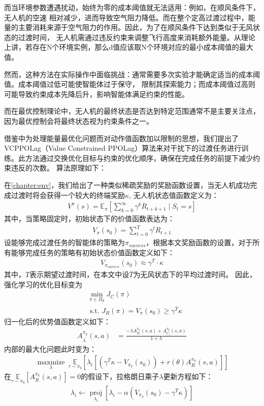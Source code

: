 而当环境参数遭遇扰动，始终为零的成本阈值就无法适用：例如，在顺风条件下，无人机的空速
相对减少，进而导致空气阻力降低。而在整个定高过渡过程中，能量的主要消耗来源于空气阻力的作用。因此，为了在顺风条件下达到类似于无风状态的过渡时间，
无人机需通过违反约束来调整飞行高度来消耗额外能量。从理论上讲，若存在N个环境实例，那么d值应该取N个环境对应的最小成本阈值的最大值。

然而，这种方法在实际操作中面临挑战：通常需要多次实验才能确定适当的成本阈值。成本阈值过低可能使智能体过于保守，
限制其探索能力；而成本阈值过高则可能导致约束成本先降后升，影响智能体满足约束的性能。

而在最优控制理论中，无人机的最终状态是否达到特定范围通常不是主要关注点，因为最优控制会将最终状态视为约束条件之一。

借鉴\parencite{bohez2019value}中为处理能量最优化问题而对动作值函数加以限制的思想，我们提出了
VCPPOLag（Value Constrained PPOLag）算法来对干扰下的过渡任务进行训练。此方法通过交换优化目标与约束的优化顺序，确保在完成任务的前提下减少约束违反的次数。
算法原理如下：

在\autoref{chapter:env}，我们给出了一种类似稀疏奖励的奖励函数设置，当无人机成功完成过渡时将会获得一个较大的终端奖励$\kappa$,
无人机状态值函数定义为：
\begin{align}
    V^{\pi}\left(s\right) = \mathbb{E}_{\pi }\left[\sum_{k = 0}^{\infty} \gamma^{k} R_{t+k+1}\mid S_{t}= s\right]
\end{align}
其中，当策略固定时，初始状态下的价值函数表达为：
\begin{align}
    V_{\pi}\left(s_{0}\right) = \sum_{t = 0}^{T} \gamma^{t} R_{t+1}
\end{align}
设能够完成过渡任务的智能体的策略为$\pi_{success}$，根据本文奖励函数的设置，对于所有能够完成任务的策略有初始状态价值函数定义如下：
\begin{align}
    V_{\pi_{success}}\left(s_{0}\right) \approx   \gamma^{T} \cdot \kappa
\end{align}
其中，$T$表示期望过渡时间，在本文中设$\bar{T}$为无风状态下的平均过渡时间。
因此，强化学习的优化目标变为
\begin{align}
    &\min _{\pi \in \Pi_{\theta}} J_{C}(\pi) \\
    &\text { s.t. } J_{R}(\pi)=V_{\pi}(s_{0}) \ge \gamma^{\bar{T}}\kappa
\end{align}
归一化后的优势值函数定义如下：
\begin{align} 
    {A}_{\lambda^{\prime}}^{\pi_{k}}(s, a)&=\frac{-\lambda A_{R}^{\pi_{k}}(s, a) +  A_{C_{i}}^{\pi_{k}}(s, a)}{1+ \lambda} 
\end{align}
内部的最大化问题此时变为：
\begin{align}
    \underset{\lambda}{\operatorname{maxmize}} \ \underset{\tau \sim \pi_{k}}{\mathbb{E}}\left[\lambda_{i}\left[(\gamma^{\bar{T}}\kappa-V_{\pi_{k}}(s_{0}))+r(\theta)A_{R}^{\pi_{k}}(s, a)\right]\right]
\end{align}
在$ \underset{\tau \sim \pi_{k}}{\mathbb{E}}\left[A_{R}^{\pi_{k}}(s, a)\right]= 0$的假设下，拉格朗日乘子$\lambda$更新方程如下：
\begin{align}
    \lambda_{i} \leftarrow \underset{\lambda_{i}}{\operatorname{proj}}\left[\lambda_{i}-\alpha\left(V_{\pi_{k}}(s_{0})-\gamma^{\bar{T}}\kappa\right)\right]
\end{align}

